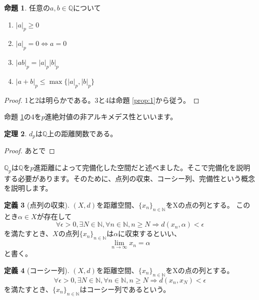 \documentclass[uplatex]{jsarticle}
\newcommand{\Q}{\mathbb{Q}}
\theoremstyle{definition} %
\newtheorem{thm}{定理}
\newtheorem{defi}[thm]{定義}
\newtheorem{prop}[thm]{命題}
\begin{document}
\begin{oframed}\begin{prop}\label{prop:2}
任意の$a, b \in \Q$について
\begin{enumerate}
\item $|a|_p \geq 0$
\item $|a|_p = 0 \iff a = 0$
\item $|ab|_p = |a|_p |b|_p$
\item $|a+b|_p \leq \max\{|a|_p, |b|_p\}$
\end{enumerate}
\end{prop}\end{oframed}
\begin{proof}
1と2は明らかである。3と4は命題 \ref{prop:1}から従う。
\end{proof}

命題 \ref{prop:2}の4を$p$進絶対値の非アルキメデス性といいます。

\begin{oframed}\begin{thm}
$d_p$は$\Q$上の距離関数である。
\end{thm}\end{oframed}
\begin{proof}
あとで
\end{proof}

$\Q_p$は$\Q$を$p$進距離によって完備化した空間だと述べました。そこで完備化を説明する必要があります。そのために、点列の収束、コーシー列、完備性という概念を説明します。

\begin{oframed}\begin{defi}[点列の収束]
$(X, d)$を距離空間、$\{x_n\}_{n\in\mathbb{N}}$をXの点の列とする。
このとき$\alpha \in X$が存在して
\[
\forall \epsilon>0, \exists N\in\mathbb{N}, \forall n \in \mathbb{N}, n \geq N \Rightarrow d(x_n, \alpha) < \epsilon
\]
を満たすとき、$X$の点列$\{x_n\}_{n\in\mathbb{N}}$は$\alpha$に収束するといい、
\[
\lim_{n \to \infty} x_n = \alpha
\]
と書く。
\end{defi}\end{oframed}

\begin{oframed}\begin{defi}[コーシー列]
$(X, d)$を距離空間、$\{x_n\}_{n\in\mathbb{N}}$をXの点の列とする。
\[
\forall \epsilon>0, \exists N\in\mathbb{N}, \forall n \in \mathbb{N}, n \geq N \Rightarrow d(x_n, x_N) < \epsilon
\]
を満たすとき、$\{x_n\}_{n\in\mathbb{N}}$はコーシー列であるという。
\end{defi}\end{oframed}
\end{document}
